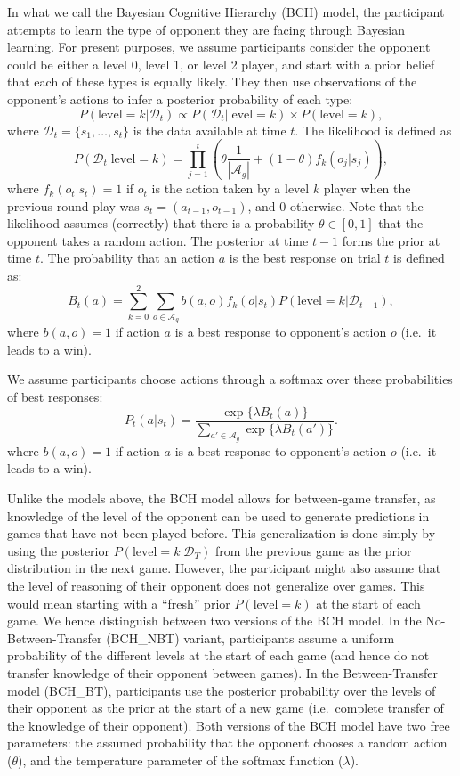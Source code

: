 \documentclass[smallextended]{svjour3}       %
\begin{document}
In what we call the Bayesian Cognitive Hierarchy (BCH) model, the
participant attempts to learn the type of opponent they are facing
through Bayesian learning. For present purposes, we assume participants
consider the opponent could be either a level 0, level 1, or level 2
player, and start with a prior belief that each of these types is
equally likely. They then use observations of the opponent's actions to
infer a posterior probability of each type:
\[P(\text{level}=k | \mathcal{D}_{t})  \propto  P(\mathcal{D}_{t}|\text{level}=k ) \times P(\text{level}=k) ,\]
where \(\mathcal{D}_{t} = \{s_1,\ldots,s_t\}\) is the data available at
time \(t\). The likelihood is defined as
\[P(\mathcal{D}_{t}|\text{level}=k) = \prod_{j=1}^t \left( \theta \frac{1}{|\mathcal{A}_g|} + (1-\theta) f_k(o_j|s_{j})\right) ,\]
where \(f_k(o_t|s_{t}) = 1\) if \(o_t\) is the action taken by a level
\(k\) player when the previous round play was
\(s_t = (a_{t-1}, o_{t-1})\), and 0 otherwise. Note that the likelihood
assumes (correctly) that there is a probability \(\theta \in [0,1]\)
that the opponent takes a random action. The posterior at time \(t-1\)
forms the prior at time \(t\). The probability that an action \(a\) is
the best response on trial \(t\) is defined as:
\[B_t(a) = \sum_{k = 0}^2 \sum_{o \in \mathcal{A}_g} b(a,o) f_k(o|s_{t})  P(\text{level}=k|\mathcal{D}_{t-1}), \]
where \(b(a,o) = 1\) if action \(a\) is a best response to opponent's
action \(o\) (i.e.~it leads to a win).

We assume participants choose actions through a softmax over these
probabilities of best responses:
\[P_t(a|s_t) = \frac{\exp\{\lambda B_t(a) \}}{\sum_{a' \in \mathcal{A}_g} \exp \{ \lambda B_t(a')\}}.\]
where \(b(a,o) = 1\) if action \(a\) is a best response to opponent's
action \(o\) (i.e.~it leads to a win).

Unlike the models above, the BCH model allows for between-game transfer,
as knowledge of the level of the opponent can be used to generate
predictions in games that have not been played before. This
generalization is done simply by using the posterior
\(P(\text{level} = k|\mathcal{D}_T)\) from the previous game as the
prior distribution in the next game. However, the participant might also
assume that the level of reasoning of their opponent does not generalize
over games. This would mean starting with a ``fresh'' prior
\(P(\text{level} = k)\) at the start of each game. We hence distinguish
between two versions of the BCH model. In the No-Between-Transfer
(BCH\_NBT) variant, participants assume a uniform probability of the
different levels at the start of each game (and hence do not transfer
knowledge of their opponent between games). In the Between-Transfer
model (BCH\_BT), participants use the posterior probability over the
levels of their opponent as the prior at the start of a new game
(i.e.~complete transfer of the knowledge of their opponent). Both
versions of the BCH model have two free parameters: the assumed
probability that the opponent chooses a random action (\(\theta\)), and
the temperature parameter of the softmax function (\(\lambda\)).
\end{document}
